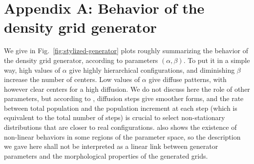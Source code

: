 \documentclass{JASSS}
\begin{document}
\endparano






\section{Appendix A: Behavior of the density grid generator}

We give in Fig.~\ref{fig:stylized-generator} plots roughly summarizing the behavior of the density grid generator, according to parameters $(\alpha,\beta)$. To put it in a simple way, high values of $\alpha$ give highly hierarchical configurations, and diminishing $\beta$ increase the number of centers. Low values of $\alpha$ give diffuse patterns, with however clear centers for a high diffusion. We do not discuss here the role of other parameters, but according to \cite{raimbault2018calibration}, diffusion steps give smoother forms, and the rate between total population and the population increment at each step (which is equivalent to the total number of steps) is crucial to select non-stationary distributions that are closer to real configurations. \cite{raimbault2018calibration} also shows the existence of non-linear behaviors in some regions of the parameter space, so the description we gave here shall not be interpreted as a linear link between generator parameters and the morphological properties of the generated grids.
\end{document}
